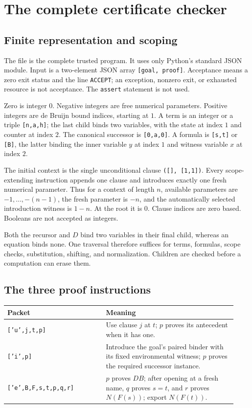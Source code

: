 \section{The complete certificate checker}
\label{sec:implementation}

\subsection{Finite representation and scoping}

The file  is the complete trusted program. It uses
only Python's standard JSON module. Input is a two-element JSON array
\texttt{[goal, proof]}. Acceptance means a zero exit status and the line
\texttt{ACCEPT}; an exception, nonzero exit, or exhausted resource is not
acceptance. The \texttt{assert} statement is not used.

Zero is integer $0$. Negative integers are free numerical parameters.
Positive integers are de Bruijn bound indices, starting at $1$. A term
is an integer or a triple \texttt{[n,a,h]}; the last child binds two
variables, with the state at index $1$ and counter at index $2$.
The canonical successor is \texttt{[0,a,0]}. A formula is
\texttt{[s,t]} or \texttt{[B]}, the latter binding the inner variable
$y$ at index $1$ and witness variable $x$ at index $2$.

The initial context is the single unconditional clause
\texttt{([], [1,1])}. Every scope-extending instruction appends one
clause and introduces exactly one fresh numerical parameter. Thus for
a context of length $n$, available parameters are
$-1,\ldots,-(n-1)$, the fresh parameter is $-n$, and the automatically
selected introduction witness is $1-n$. At the root it is $0$.
Clause indices are zero based. Booleans are not accepted as integers.

Both the recursor and $D$ bind two variables in their final child, whereas
an equation binds none. One traversal therefore suffices for terms,
formulas, scope checks, substitution, shifting, and normalization.
Children are checked before a computation can erase them.

\subsection{The three proof instructions}

\begin{center}
\begin{tabular}{p{0.40\linewidth}p{0.53\linewidth}}
\toprule
Packet & Meaning\\
\midrule
\texttt{['u',j,t,p]} & Use clause $j$ at $t$; $p$ proves its antecedent
when it has one.\\[3pt]
\texttt{['i',p]} & Introduce the goal's paired binder with its fixed
environmental witness; $p$ proves the required successor instance.\\[3pt]
\texttt{['e',B,F,s,t,p,q,r]} & $p$ proves $D B$; after opening at a
fresh name, $q$ proves $s=t$, and $r$ proves $N(F(s))$; export $N(F(t))$.\\
\bottomrule
\end{tabular}
\end{center}

